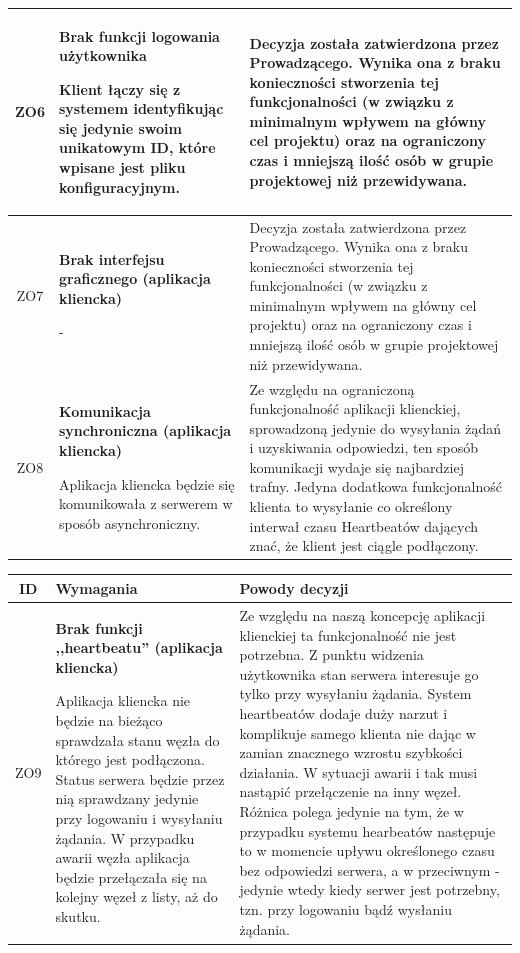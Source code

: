 {\begin{tabularx}{\textwidth}{|c|X|X|}
\label{z:ZO6} ZO6 &  \textbf{Brak funkcji logowania użytkownika}

Klient łączy się z systemem identyfikując się jedynie swoim unikatowym ID, które wpisane jest pliku konfiguracyjnym. & 
Decyzja została zatwierdzona przez Prowadzącego. Wynika ona z braku konieczności stworzenia tej funkcjonalności (w związku z minimalnym wpływem na główny cel projektu) oraz na ograniczony czas i mniejszą ilość osób w grupie projektowej niż przewidywana.  \\
\hline

\label{z:ZO7} ZO7 &  \textbf{Brak interfejsu graficznego (aplikacja kliencka)}

- & 
Decyzja została zatwierdzona przez Prowadzącego. Wynika ona z braku konieczności stworzenia tej funkcjonalności (w związku z minimalnym wpływem na główny cel projektu) oraz na ograniczony czas i mniejszą ilość osób w grupie projektowej niż przewidywana.
\\
\hline
\label{z:ZO8} ZO8 &  \textbf{Komunikacja synchroniczna (aplikacja kliencka)}

Aplikacja kliencka będzie się komunikowała z serwerem w sposób asynchroniczny. & 
Ze względu na ograniczoną funkcjonalność aplikacji klienckiej, sprowadzoną jedynie do wysyłania żądań i uzyskiwania odpowiedzi, ten sposób komunikacji wydaje się najbardziej trafny. Jedyna dodatkowa funkcjonalność klienta to wysyłanie co określony interwał czasu Heartbeatów dających znać, że klient jest ciągle podłączony.\\
\hline

\end{tabularx}

\pagebreak

\begin{tabularx}{\textwidth}{|c|X|X|}
\hline
\textbf{ID} & \textbf{Wymagania}  & \textbf{Powody decyzji} \\
\hline
\label{z:ZO9} ZO9 &  \textbf{Brak funkcji ,,heartbeatu'' (aplikacja kliencka)}

Aplikacja kliencka nie będzie na bieżąco sprawdzała stanu węzła do którego jest podłączona. Status serwera będzie przez nią sprawdzany jedynie przy logowaniu i wysyłaniu żądania. W przypadku awarii węzła aplikacja będzie przełączała się na kolejny węzeł z listy, aż do skutku. & 
Ze względu na naszą koncepcję aplikacji klienckiej ta funkcjonalność nie jest potrzebna. Z punktu widzenia użytkownika stan serwera interesuje go tylko przy wysyłaniu żądania. System heartbeatów dodaje duży narzut i komplikuje samego klienta nie dając w zamian znacznego wzrostu szybkości działania. W sytuacji awarii i tak musi nastąpić przełączenie na inny węzeł. Różnica polega jedynie na tym, że w przypadku systemu hearbeatów następuje to w momencie upływu określonego czasu bez odpowiedzi serwera, a w przeciwnym - jedynie wtedy kiedy serwer jest potrzebny, tzn. przy logowaniu bądź wysłaniu żądania.\\
\hline


\end{tabularx}}
